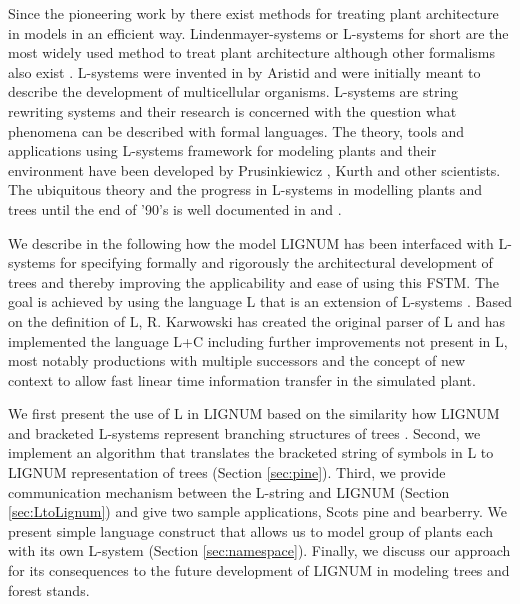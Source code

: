 Since the pioneering work  by \citet{honda:71} there exist methods for
treating   plant  architecture   in  models   in  an   efficient  way.
Lindenmayer-systems or L-systems for  short \citep{pp:89} are the most
widely  used  method  to   treat  plant  architecture  although  other
formalisms   also  exist \citep[e.g.][]{dereffye:97,   godin:99}.
L-systems   were  invented   in   by  Aristid   \citet{lindenmayer:68,
  lindenmayer:71} and were initially meant to describe the development
of  multicellular organisms.  L-systems  are string  rewriting systems
and their research  is concerned with the question  what phenomena can
be   described  with   formal  languages.    The  theory,   tools  and
applications using  L-systems framework for modeling  plants and their
environment have been  developed by Prusinkiewicz \citep{pp:89,pp:92},
Kurth  \citep{kurth:94} and other  scientists.  The  ubiquitous theory
and the progress in L-systems  in modelling plants and trees until the
end   of  '90's   is  well   documented  in   \citet{pp:90,pp:99}  and
\citet{kurth:99}.

We describe in the following  how the model LIGNUM has been interfaced
with   L-systems   for   specifying   formally  and   rigorously   the
architectural   development  of  trees   and  thereby   improving  the
applicability and  ease of using this  FSTM.  The goal  is achieved by
using the language L that  is an extension of L-systems \citep{pp:99a}.
Based on the definition of  L, R.  Karwowski has created the original
parser of L and  has implemented the language L+C \citep{karwowski:02}
including  further  improvements  not   present  in  L,  most  notably
productions with multiple successors and the concept of new context
\citep{karwowski:03} to allow fast linear time information transfer in
the simulated plant.

We first  present the use of L  in LIGNUM based on  the similarity how
LIGNUM and bracketed L-systems represent branching structures of trees
\citep{perttunen:96, perttunen:01}.  Second, we implement an algorithm
that  translates  the bracketed  string  of  symbols  in L  to  LIGNUM
representation of  trees (Section \ref{sec:pine}).   Third, we provide
communication  mechanism  between  the  L-string and  LIGNUM  (Section
\ref{sec:LtoLignum}) and give two  sample applications, Scots pine and
bearberry.   We present simple  language construct  that allows  us to
model   group  of  plants   each  with   its  own   L-system  (Section
\ref{sec:namespace}).   Finally,  we  discuss  our  approach  for  its
consequences to the future development of LIGNUM in modeling trees and
forest stands.

